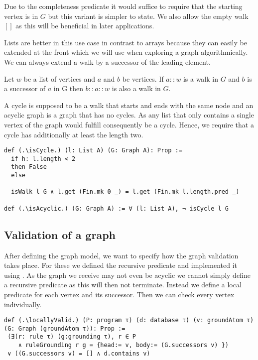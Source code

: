 Due to the completeness predicate it would suffice to require that the starting vertex is in $G$ but this variant is simpler to state. We also allow the empty walk $[]$ as this will be beneficial in later applications.

Lists are better in this use case in contrast to arrays because they can easily be extended at the front which we will use when exploring a graph algorithmically. We can always extend a walk by a successor of the leading element.

\begin{lemma}[\isWalkextendssuccessors]
    Let $w$ be a list of vertices and $a$ and $b$ be vertices.
    If $a::w$ is a walk in $G$ and $b$ is a successor of $a$ in G then $b::a::w$ is also a walk in $G$.
\end{lemma}

A cycle is supposed to be a walk that starts and ends with the same node and an acyclic graph is a graph that has no cycles. As any list that only contains a single vertex of the graph would fulfill consequently be a cycle. Hence, we require that a cycle has additionally at least the length two.

\begin{lstlisting}
def (.\isCycle.) (l: List A) (G: Graph A): Prop :=
  if h: l.length < 2
  then False
  else

  isWalk l G ∧ l.get (Fin.mk 0 _) = l.get (Fin.mk l.length.pred _)

def (.\isAcyclic.) (G: Graph A) := ∀ (l: List A), ¬ isCycle l G
\end{lstlisting}

\subsection{Validation of a graph}

After defining the graph model, we want to specify how the graph validation takes place. For these we defined the recursive predicate \isValid and implemented it using \treeValidator. As the graph we receive may not even be acyclic we cannot simply define a recursive predicate as this will then not terminate. Instead we define a local predicate for each vertex and its successor. Then we can check every vertex individually.

\begin{lstlisting}
def (.\locallyValid.) (P: program τ) (d: database τ) (v: groundAtom τ) (G: Graph (groundAtom τ)): Prop :=
 (∃(r: rule τ) (g:grounding τ), r ∈ P 
    ∧ ruleGrounding r g = {head:= v, body:= (G.successors v) }) 
 ∨ ((G.successors v) = [] ∧ d.contains v)
\end{lstlisting}

